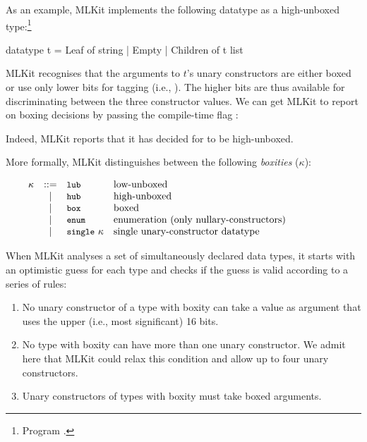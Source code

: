 \documentclass[12pt]{book}
\begin{document}
As an example, MLKit implements the following datatype as a high-unboxed
type:\footnote{Program .}

\begin{smlcode}
  datatype t = Leaf of string | Empty | Children of t list
\end{smlcode}

\noindent
MLKit recognises that the arguments to $t$'s unary constructors are either boxed
or use only lower bits for tagging (i.e., ). The higher bits are thus
available for discriminating between the three constructor values. We can get
MLKit to report on boxing decisions by passing the compile-time flag
:

\noindent
Indeed, MLKit reports that it has decided for  to be high-unboxed.

More formally, MLKit distinguishes between the following \emph{boxities}
($\kappa$):
%
%
%

\[
\begin{array}{lclp{8cm}}
  \kappa & ::= & \kw{lub} & low-unboxed \\
         & |   & \kw{hub} & high-unboxed \\
         & |   & \kw{box} & boxed \\
         & |   & \kw{enum} & enumeration (only nullary-constructors) \\
         & |   & \kw{single}~\kappa & single unary-constructor datatype
\end{array}
\]

\noindent
When MLKit analyses a set of simultaneously declared data types, it
starts with an optimistic guess for each type and checks if the guess is valid
according to a series of rules:

\begin{enumerate}
\item No unary constructor of a type with boxity  can take a value as
  argument that uses the upper (i.e., most significant) 16 bits.
\item No type with boxity  can have more than one unary constructor. We
  admit here that MLKit could relax this condition and allow up to four unary
  constructors.
\item Unary constructors of types with boxity  must take boxed
  arguments.
\end{enumerate}
\end{document}
